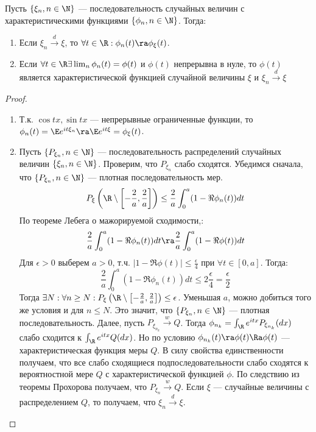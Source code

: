 \begin{theorem}
    Пусть \(\{\xi_n, n \in \N\}\) --- последовательность случайных величин с характеристическими функциями \(\{\phi_n, n \in \N\}\). Тогда:
    \begin{enumerate}
        \item Если \(\xi_n \xrightarrow{d} \xi\), то \(\forall t \in \R: \phi_n(t) \ra \phi_\xi(t)\).
        \item Если \(\forall t \in \R \exists \lim_n \phi_n(t) = \phi(t)\) и \(\phi(t)\) непрерывна в нуле, то \(\phi(t)\) является характеристической функцией случайной величины \(\xi\) и \(\xi_n \xrightarrow{d} \xi\)
    \end{enumerate}
\end{theorem}
\begin{proof}
    \begin{enumerate}
        \item Т.к. \(\cos tx, \sin tx\) --- непрерывные ограниченные функции, то \(\phi_n(t) = \E e^{it\xi_n} \ra \E e^{it\xi} = \phi_\xi(t)\).
        \item Пусть \(\{P_{\xi_n}, n \in \N\}\) --- последовательность распределений случайных величин \(\{\xi_n, n \in \N\}\). Проверим, что \(P_{\xi_n}\) слабо сходятся. Убедимся сначала, что \(\{P_{\xi_n}, n \in \N\}\) --- плотная последовательность мер.
        \[P_\xi\left( \R \setminus \left[ -\frac{2}{a}, \frac{2}{a} \right] \right) \le \frac{2}{a}\int_0^a(1 - \Re \phi_n(t))dt\]
        По теореме Лебега о мажорируемой сходимости,:
        \[\frac{2}{a}\int_0^a(1 - \Re \phi_n(t))dt \ra \frac{2}{a}\int_0^a(1 - \Re \phi(t))dt\]
        Для \(\epsilon > 0\) выберем \(a > 0\), т.ч. \(|1 - \Re \phi(t)| \le \frac{\epsilon}{4}\) при \(\forall t \in [0, a]\). Тогда:
        \[\frac{2}{a}\int_0^a(1 - \Re \phi_n(t))dt \le 2\frac{\epsilon}{4} = \frac{\epsilon}{2}\]
        Тогда \(\exists N: \forall n \ge N: P_\xi\left( \R \setminus \left[ -\frac{2}{a}, \frac{2}{a} \right] \right) \le \epsilon\). Уменьшая \(a\), можно добиться того же условия и для \(n \le N\). Это значит, что \(\{P_{\xi_n}, n \in \N\}\) --- плотная последовательность. Далее, пусть \(P_{\xi_{n_k}} \xrightarrow{w} Q\). Тогда \(\phi_{n_k} = \int_\R e^{itx}P_{\xi_{n_k}}(dx)\) слабо сходится к \(\int_\R e^{itx} Q(dx)\). Но по условию \(\phi_{n_k}(t) \ra \phi(t) \Ra \phi(t)\) --- характеристическая функция меры \(Q\). В силу свойства единственности получаем, что все слабо сходящиеся подпоследовательности слабо сходятся к вероятностной мере \(Q\) с характеристической функцией \(\phi\). По следствию из теоремы Прохорова получаем, что \(P_{\xi_n} \xrightarrow{w} Q\). Если \(\xi\) --- случайные величины с распределением \(Q\), то получаем, что \(\xi_n \xrightarrow{d} \xi\).
    \end{enumerate}
\end{proof}

